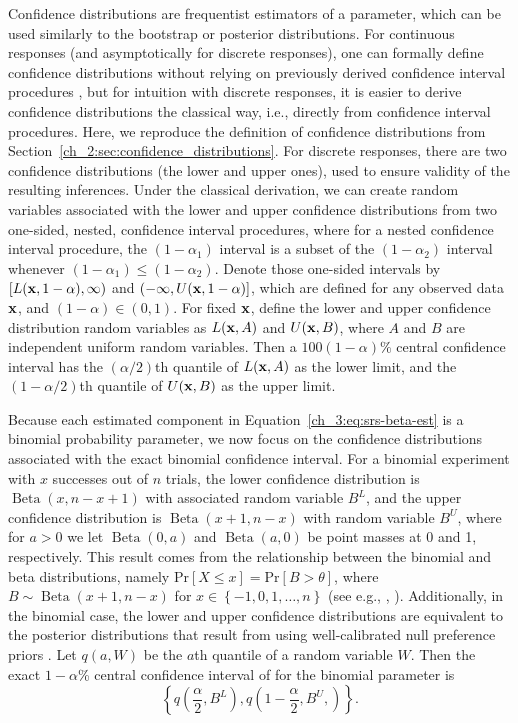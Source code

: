 Confidence distributions are frequentist estimators of a parameter, which can be used similarly to the bootstrap or posterior distributions.
For continuous responses (and asymptotically for discrete responses), one can formally define confidence distributions without relying on previously derived confidence interval procedures \citep{Xie2013}, but for intuition with discrete responses, it is easier to derive confidence distributions the classical way, i.e., directly from confidence interval procedures.
Here, we reproduce the definition of confidence distributions from Section~\ref{ch_2:sec:confidence_distributions}.
For discrete responses, there are two confidence distributions (the lower and upper ones), used to ensure validity of the resulting inferences.
Under the classical derivation, we can create random variables associated with the lower and upper confidence distributions from two one-sided, nested, confidence interval procedures, where for a nested confidence interval procedure, the $(1-\alpha_1)$ interval is a subset of the $(1-\alpha_2)$ interval whenever $(1-\alpha_1) \leq (1-\alpha_2)$.
Denote those one-sided intervals by $[L({\bf x},1-\alpha), \infty)$ and $(-\infty, U({\bf x},1-\alpha)]$, which are defined for any observed data ${\bf x}$, and $(1-\alpha) \in (0,1)$.
For fixed ${\bf x}$, define the lower and upper confidence distribution random variables as $L({\bf x}, A)$ and $U({\bf x},B)$, where $A$ and $B$ are independent uniform random variables.
Then a $100(1-\alpha)\%$ central confidence interval has the $(\alpha/2)$th quantile of $L({\bf x}, A)$ as the lower limit, and the $(1-\alpha/2)$th quantile of $U({\bf x},B)$ as the upper limit.

Because each estimated component in Equation~\ref{ch_3:eq:srs-beta-est} is a binomial probability parameter, we now focus on the confidence distributions associated with the exact binomial confidence interval.
For a binomial experiment with \( x \) successes out of \( n \) trials, the lower confidence distribution is \( \operatorname{Beta}(x, n - x + 1) \) with associated random variable \( B^L \), and the upper confidence distribution is \( \operatorname{Beta}(x + 1, n - x)\) with random variable \( B^U \), where for $a>0$ we let \( \operatorname{Beta}(0,a) \) and \( \operatorname{Beta}(a,0) \) be point masses at 0 and 1, respectively.
This result comes from the relationship between the binomial and beta distributions, namely $\mathrm{Pr}[X \leq x] = \mathrm{Pr}[B > \theta]$, where $B \sim \operatorname{Beta}(x + 1, n - x)$ for $x \in \left\{ -1,0, 1, \ldots, n \right\}$ (see e.g., \citep[Section~2]{Blyth1986}, \citep[Section~S2]{Fay2021}).
Additionally, in the binomial case, the lower and upper confidence distributions are equivalent to
the posterior distributions that result from using well-calibrated null preference priors \citep{Fay2021}.
Let \( q(a, W) \) be the \( a \)th quantile of a random variable \( W \). Then the exact \( 1 - \alpha \)\% central confidence interval of \citep{10.1093/biomet/26.4.404} for the binomial parameter is
\begin{equation}
\left\{ q \left( \frac{\alpha}{2}, B^L \right), q \left( 1 - \frac{\alpha}{2}, B^U, \right) \right\}.
\label{ch_3:eq:C-P}
\end{equation}

